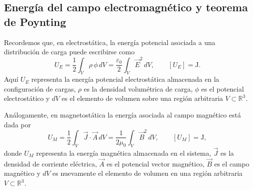 \documentclass[12pt,a4paper]{article}
\theoremstyle{definition}
\theoremstyle{plain}
\numberwithin{equation}{section}
\theoremstyle{remark}
\newcommand{\E}{\vec{E}}
\newcommand{\B}{\vec{B}}
\newcommand{\J}{\vec{J}}
\newcommand{\A}{\vec{A}}
\begin{document}

\subsection{Energía del campo electromagnético y teorema de Poynting}

Recordemos que, en electrostática, la energía potencial asociada a una distribución de carga puede escribirse como
\begin{equation}
    U_E=\frac{1}{2}\int_V \rho\,\phi\, dV
    =\frac{\varepsilon_0}{2}\int_V \E^2\, dV,
    \qquad [U_E]=\mathrm{J}.
    \label{eq:energia-electrostatica}
\end{equation}
Aquí $U_E$ representa la energía potencial electrostática almacenada en la configuración de cargas, $\rho$ es la densidad volumétrica de carga, $\phi$ es el potencial electrostático y $dV$ es el elemento de volumen sobre una región arbitraria $V\subset\mathbb R^3$.

Análogamente, en magnetostática la energía asociada al campo magnético está dada por
\begin{equation}
    U_M=\frac{1}{2}\int_V \J\cdot \A\, dV
    =\frac{1}{2\mu_0}\int_V \B^2\, dV,
    \qquad [U_M]=\mathrm{J},
    \label{eq:energia-magnetostatica}
\end{equation}
donde $U_M$ representa la energía magnética almacenada en el sistema, $\J$ es la densidad de corriente eléctrica, $\A$ es el potencial vector magnético, $\B$ es el campo magnético y $dV$ es nuevamente el elemento de volumen en una región arbitraria $V\subset\mathbb R^3$.
\end{document}
